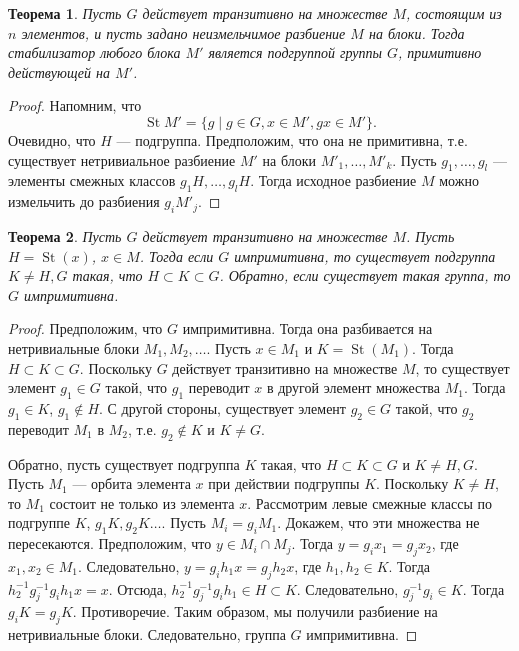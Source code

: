 \documentclass[12pt, titlepage, oneside]{amsbook}
\newcommand{\St}{\operatorname{St}}
\newtheorem{theorem}{Теорема}[chapter]
\theoremstyle{definition}
\theoremstyle{remark}
\begin{document}
\begin{theorem}
\label{Tr2} Пусть $G$ действует транзитивно на множестве $M$, состоящим из $n$ элементов, и пусть задано неизмельчимое разбиение $M$ на блоки. Тогда стабилизатор любого блока $M'$ является подгруппой группы $G$, примитивно действующей на $M'$.
\end{theorem}

\begin{proof}
Напомним, что $$\St M'=\{g\mid g\in G, x\in M', gx\in M'\}.$$ Очевидно, что $H$ --- подгруппа. Предположим, что она не примитивна, т.е. существует нетривиальное разбиение $M'$ на блоки $M'_1,\ldots, M'_k$. Пусть $g_1,\ldots,g_l$ --- элементы смежных классов $g_1H,\ldots,g_lH$. Тогда исходное разбиение $M$ можно измельчить до разбиения $g_iM'_j$.
\end{proof}

\begin{theorem}
\label{Tr3} Пусть $G$ действует транзитивно на множестве $M$. Пусть $H=\St(x)$, $x\in M$. Тогда если $G$ импримитивна, то существует подгруппа $K\neq H,G$ такая, что $H\subset K\subset G$. Обратно, если существует такая группа, то $G$ импримитивна.
\end{theorem}

\begin{proof}
Предположим, что $G$ импримитивна. Тогда она разбивается на нетривиальные блоки $M_1, M_2,\ldots$. Пусть $x\in M_1$ и $K=\St(M_1)$. Тогда $H\subset K\subset G$. Поскольку $G$ действует транзитивно на множестве $M$, то существует элемент $g_1\in G$ такой, что $g_1$ переводит $x$ в другой элемент множества $M_1$. Тогда $g_1\in K$, $g_1\not\in H$. С другой стороны, существует элемент $g_2\in G$ такой, что $g_2$ переводит $M_1$ в $M_2$, т.е. $g_2\not\in K$ и $K\neq G$.

Обратно, пусть существует подгруппа $K$ такая, что $H\subset K\subset G$ и $K\neq H,G$. Пусть $M_1$ --- орбита элемента $x$ при действии подгруппы $K$. Поскольку $K\neq H$, то $M_1$ состоит не только из элемента $x$. Рассмотрим левые смежные классы по подгруппе $K$, $g_1K,g_2K\ldots$. Пусть $M_i=g_i M_1$. Докажем, что эти множества не пересекаются. Предположим, что $y\in M_i\cap M_j$. Тогда $y=g_i x_1=g_j x_2$, где $x_1,x_2\in M_1$. Следовательно, $y=g_i h_1 x=g_j h_2 x$, где $h_1,h_2\in K$. Тогда $h^{-1}_2g^{-1}_j g_ih_1 x=x$. Отсюда, $h^{-1}_2g^{-1}_j g_ih_1\in H\subset K$. Следовательно, $g^{-1}_j g_i\in K$. Тогда $g_i K= g_j K$. Противоречие. Таким образом, мы получили разбиение на нетривиальные блоки. Следовательно, группа $G$ импримитивна.
\end{proof}
\end{document}
